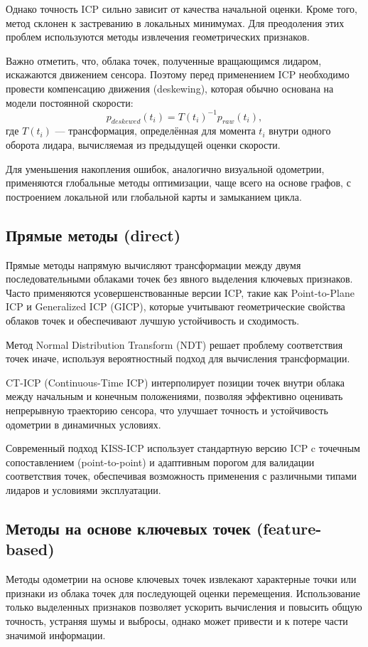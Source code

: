 Однако точность ICP сильно зависит от качества начальной 
оценки. Кроме того, метод склонен к застреванию в локальных минимумах. Для преодоления 
этих проблем используются методы извлечения геометрических признаков.

Важно отметить, что, облака точек, полученные вращающимся лидаром, искажаются движением сенсора. 
Поэтому перед применением ICP необходимо провести компенсацию движения (deskewing), 
которая обычно основана на модели постоянной скорости:
\begin{equation}
    p_{deskewed}(t_i) = T(t_i)^{-1} p_{raw}(t_i),
\end{equation}
где $T(t_i)$ --- трансформация, определённая для момента $t_i$ внутри одного оборота 
лидара, вычисляемая из предыдущей оценки скорости.

Для уменьшения накопления ошибок, аналогично визуальной одометрии, применяются
глобальные методы оптимизации, чаще всего на основе графов, с построением 
локальной или глобальной карты и замыканием цикла.

\subsection{Прямые методы (direct)}
Прямые методы напрямую вычисляют трансформации между двумя последовательными 
облаками точек без явного выделения ключевых признаков. Часто применяются усовершенствованные версии 
ICP, такие как Point-to-Plane ICP и Generalized ICP (GICP), которые учитывают 
геометрические свойства облаков точек и обеспечивают лучшую устойчивость 
и сходимость.

Метод Normal Distribution Transform (NDT) решает проблему соответствия точек 
иначе, используя вероятностный подход для вычисления 
трансформации. 

CT-ICP (Continuous-Time ICP) интерполирует позиции точек внутри облака между 
начальным и конечным положениями, позволяя эффективно оценивать непрерывную 
траекторию сенсора, что улучшает точность и устойчивость одометрии в динамичных 
условиях.

Современный подход KISS-ICP использует стандартную версию ICP c точечным сопоставлением 
(point-to-point) и адаптивным порогом для валидации соответствия точек, обеспечивая 
возможность применения с различными типами лидаров и условиями эксплуатации.


\subsection{Методы на основе ключевых точек (feature-based)}
Методы одометрии на основе ключевых точек извлекают характерные точки или 
признаки из облака точек для последующей оценки 
перемещения. Использование только выделенных признаков позволяет ускорить 
вычисления и повысить общую точность, устраняя шумы и выбросы, однако может привести
и к потере части значимой информации.

